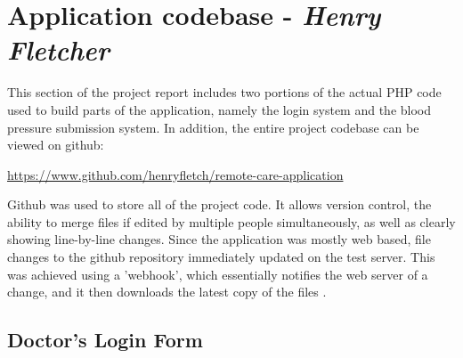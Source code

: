 \documentclass[11pt]{article}
\begin{document}
\section{Application codebase - \textit{Henry Fletcher}}
This section of the project report includes two portions of the actual PHP code used to build parts of the application, namely the login system and the blood pressure submission system. In addition, the entire project codebase can be viewed on github:
\begin{framed}
\url{https://www.github.com/henryfletch/remote-care-application}
\end{framed}
Github was used to store all of the project code. It allows version control, the ability to merge files if edited by multiple people simultaneously, as well as clearly showing line-by-line changes. Since the application was mostly web based, file changes to the github repository immediately updated on the test server. This was achieved using a 'webhook', which essentially notifies the web server of a change, and it then downloads the latest copy of the files \cite{github:webhooks} \cite{github:webhook-2}. 


\subsection{Doctor's Login Form} \label{drloginform}

\end{document}
